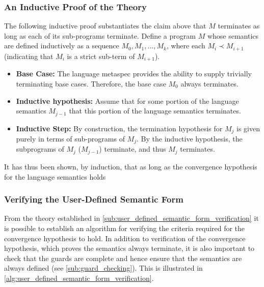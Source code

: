 \subsubsection{An Inductive Proof of the Theory} %
\label{ssub:an_inductive_proof_of_the_theory}
The following inductive proof substantiates the claim above that $M$ terminates as long as each of its sub-programs terminate. 
Define a program $M$ whose semantics are defined inductively as a sequence $M_0, M_1, \dots, M_k$, where each $M_i \prec M_{i+1}$ (indicating that $M_i$ is a strict sub-term of $M_{i+1}$).
\begin{itemize}
    \item \textbf{Base Case:} The language \gls{metaspec} provides the ability to supply trivially terminating base cases.
    Therefore, the base case $M_0$ always terminates. 
    \item \textbf{Inductive hypothesis:} Assume that for some portion of the language semantics $M_{j-1}$ that this portion of the language semantics terminates.
    \item \textbf{Inductive Step:} By construction, the termination hypothesis for $M_j$ is given purely in terms of sub-programs of $M_j$. 
    By the inductive hypothesis, the subprograms of $M_j$ ($M_{j-1}$) terminate, and thus $M_j$ terminates.
\end{itemize}

It has thus been shown, by induction, that as long as the convergence hypothesis for the language semantics holds


\subsubsection{Verifying the User-Defined Semantic Form} %
\label{ssub:verifying_the_user_defined_semantic_form}
From the theory established in \autoref{sub:user_defined_semantic_form_verification} it is possible to establish an algorithm for verifying the criteria required for the convergence hypothesis to hold.
In addition to verification of the convergence hypothesis, which proves the semantics always terminate, it is also important to check that the guards are complete and hence ensure that the semantics are always defined (see \autoref{sub:guard_checking}).
This is illustrated in \autoref{alg:user_defined_semantic_form_verification}.

